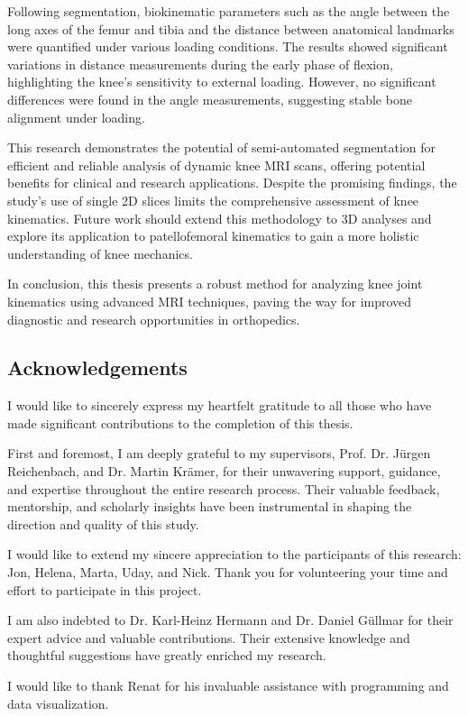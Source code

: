 \documentclass{micro-econ-thesis}
\begin{document}
Following segmentation, biokinematic parameters such as the angle between the long axes of the femur and tibia and the distance between anatomical landmarks were quantified under various loading conditions. The results showed significant variations in distance measurements during the early phase of flexion, highlighting the knee's sensitivity to external loading. However, no significant differences were found in the angle measurements, suggesting stable bone alignment under loading.

This research demonstrates the potential of semi-automated segmentation for efficient and reliable analysis of dynamic knee MRI scans, offering potential benefits for clinical and research applications. Despite the promising findings, the study's use of single 2D slices limits the comprehensive assessment of knee kinematics. Future work should extend this methodology to 3D analyses and explore its application to patellofemoral kinematics to gain a more holistic understanding of knee mechanics.

In conclusion, this thesis presents a robust method for analyzing knee joint kinematics using advanced MRI techniques, paving the way for improved diagnostic and research opportunities in orthopedics.

\clearpage
\subsection*{Acknowledgements}
I would like to sincerely express my heartfelt gratitude to all those who have made significant contributions to the completion of this thesis.

First and foremost, I am deeply grateful to my supervisors, Prof. Dr. Jürgen Reichenbach, and Dr. Martin Krämer, for their unwavering support, guidance, and expertise throughout the entire research process. Their valuable feedback, mentorship, and scholarly insights have been instrumental in shaping the direction and quality of this study.


I would like to extend my sincere appreciation to the participants of this research: Jon, Helena, Marta, Uday, and Nick. Thank you for volunteering your time and effort to participate in this project.
 
 
I am also indebted to Dr. Karl-Heinz Hermann and Dr. Daniel Güllmar for their expert advice and valuable contributions. Their extensive knowledge and thoughtful suggestions have greatly enriched my research.

I would like to thank Renat for his invaluable assistance with programming and data visualization. 
\end{document}
